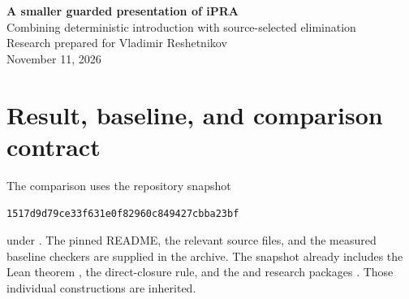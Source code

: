 \documentclass[11pt,letterpaper]{article}
\theoremstyle{definition}
\newcommand{\code}[1]{\texttt{\detokenize{#1}}}
\newcommand{\pin}{\texttt{1517d9d79ce33f631e0f82960c849427cbba23bf}}
\begin{document}
\begin{center}
{\LARGE\bfseries\color{ink}A smaller guarded presentation of iPRA}\\[7pt]
{\large Combining deterministic introduction with source-selected elimination}\\[10pt]
Research prepared for Vladimir Reshetnikov\\[3pt]
November 11, 2026
\end{center}

\begin{abstract}
The two reductions called \emph{guarded core} and \emph{source dispatch} in
ConciseIPRA can be used together. The mathematical point is a dependency
theorem: literal-zero-source transport is already admissible in a purely
equational fragment with contextual equation induction. Its proof does not
need logical case introduction. This breaks the apparent circularity between
the two reductions.

The resulting presentation is bi-interpretable and equiconsistent with full
first-order intuitionistic primitive recursive arithmetic. Both numerical
domains are whole, equality is actual equality, and both numerical
composites have the identity graph. The public formulas have the existing
guarded grammar; proof trees may contain the explicitly specified auxiliary
formulas. Three complete compact checker profiles attain 257 significant
tokens, 279 AST nodes, and 522 normalized bytes, respectively, improving the
pinned coordinate minima 259, 283, and 526. These are separate programs.
A standalone version that also validates the closed public-goal grammar is
1,202 normalized bytes, versus 1,208 for the corresponding guarded-core
validator and kernel. The gain is strict but small. No absolute minimality
or new proof-assistant verification is claimed.
\end{abstract}

\section{Result, baseline, and comparison contract}

The comparison uses the repository snapshot
\begin{center}\pin\end{center}
under .
The pinned README, the relevant source files, and the measured baseline
checkers are supplied in the archive. The snapshot already includes the
Lean theorem \code{zprf_iff_nprf}, the direct-closure rule, and the
\code{guarded_core} and \code{source_dispatch} research packages
\cite{repo,guarded,source,lean}. Those individual constructions are inherited.
\end{document}
